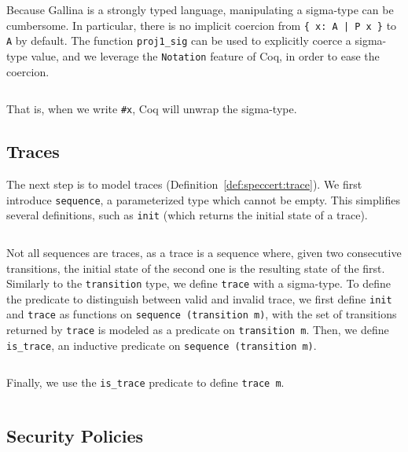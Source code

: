 \inputminted[gobble=2,firstline=29,lastline=32]{coq}{Listings/SpecCert.v}

Because {\textsc Gallina} is a strongly typed language, manipulating a sigma-type
can be cumbersome.
%
In particular, there is no implicit coercion from \texttt{\{ x: A | P x \}} to
\texttt{A} by default.
%
The function \texttt{proj1\_sig} can be used to explicitly coerce a sigma-type
value, and we leverage the \texttt{Notation} feature of Coq, in order to ease
the coercion.

\inputminted[gobble=2,firstline=34,lastline=35]{coq}{Listings/SpecCert.v}

That is, when we write \texttt{\#x}, Coq will unwrap the sigma-type.

\subsection{Traces}

The next step is to model traces (Definition~\ref{def:speccert:trace}).
%
We first introduce \texttt{sequence}, a parameterized type which cannot be
empty.
%
This simplifies several definitions, such as \texttt{init} (which returns the
initial state of a trace).

\inputminted[gobble=2,firstline=39,lastline=46]{coq}{Listings/SpecCert.v}

Not all sequences are traces, as a trace is a sequence where, given two
consecutive transitions, the initial state of the second one is the resulting
state of the first.
%
Similarly to the \texttt{transition} type, we define \texttt{trace} with a
sigma-type.
%
To define the predicate to distinguish between valid and invalid trace, we first
define \texttt{init} and \texttt{trace} as functions on \texttt{sequence
  (transition~m)}, with the set of transitions returned by \texttt{trace} is
modeled as a predicate on \texttt{transition m}.
%
Then, we define \texttt{is\_trace}, an inductive predicate on \texttt{sequence
  (transition~m)}.

\inputminted[gobble=2,firstline=62,lastline=71]{coq}{Listings/SpecCert.v}

Finally, we use the \texttt{is\_trace} predicate to define \texttt{trace m}.

\inputminted[gobble=2,firstline=73,lastline=76]{coq}{Listings/SpecCert.v}

\subsection{Security Policies}

